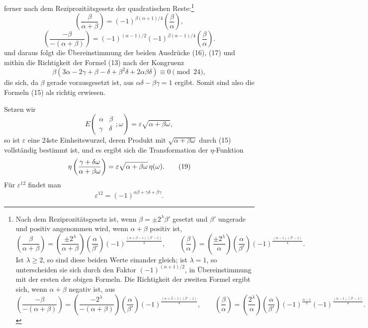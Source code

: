 \documentclass[11pt]{article}
\providecommand{\Jac}[2]{\left(\frac{#1}{#2}\right)}
\begin{document}
ferner nach dem Reziprozitätsgesetz der quadratischen Reste:\footnote{Nach dem Reziprozitätsgesetz ist, wenn $\beta=\pm2^\lambda\beta'$ gesetzt und $\beta'$ ungerade und positiv angenommen wird, wenn $\alpha+\beta$ positiv ist,
\[
\Jac{\beta}{\alpha+\beta}=\Jac{\pm2^\lambda}{\alpha+\beta}\Jac{\alpha}{\beta'}(-1)^{\frac{(\alpha+\beta-1)(\beta'-1)}{4}},
\qquad
\Jac{\beta}{\alpha}=\Jac{\pm2^\lambda}{\alpha}\Jac{\alpha}{\beta'}(-1)^{\frac{(\alpha-1)(\beta'-1)}{4}}.
\]
Ist $\lambda\ge2$, so sind diese beiden Werte einander gleich; ist $\lambda=1$, so unterscheiden sie sich durch den Faktor $(-1)^{(\alpha+1)/2}$, in Übereinstimmung mit der ersten der obigen Formeln. Die Richtigkeit der zweiten Formel ergibt sich, wenn $\alpha+\beta$ negativ ist, aus
\[
\Jac{-\beta}{-(\alpha+\beta)}=\Jac{-2^\lambda}{-(\alpha+\beta)}\Jac{\alpha}{\beta'}(-1)^{\frac{(\alpha+\beta-1)(\beta'-1)}{4}},
\qquad
\Jac{\beta}{\alpha}=\Jac{2^\lambda}{\alpha}\Jac{\alpha}{\beta'}(-1)^{\frac{\alpha-1}{2}}(-1)^{\frac{(\alpha-1)(\beta'-1)}{4}}.
\]
}
\[
\Jac{\beta}{\alpha+\beta}=(-1)^{\beta(\alpha+1)/4}\Jac{\beta}{\alpha},
\]
\[
\Jac{-\beta}{-(\alpha+\beta)}=(-1)^{(\alpha-1)/2}(-1)^{\beta(\alpha-1)/4}\Jac{\beta}{\alpha}.
\]
und daraus folgt die Übereinstimmung der beiden Ausdrücke (16), (17) und mithin die Richtigkeit der Formel (13) nach der Kongruenz
\[
\beta(3\alpha-2\gamma+\beta-\delta+\beta^2\delta+2\alpha\beta\delta)
\equiv0\pmod{24},
\]
die sich, da $\beta$ gerade vorausgesetzt ist, aus $\alpha\delta-\beta\gamma=1$ ergibt. Somit sind also die Formeln (15) als richtig erwiesen.

Setzen wir
\begin{equation}
E\left(\begin{matrix}\alpha&\beta\\\gamma&\delta\end{matrix};\omega\right)
=\varepsilon\sqrt{\alpha+\beta\omega},
\tag{18}
\end{equation}
so ist $\varepsilon$ eine 24ste Einheitswurzel, deren Produkt mit $\sqrt{\alpha+\beta\omega}$ durch (15) vollständig bestimmt ist, und es ergibt sich die Transformation der $\eta$-Funktion
\begin{equation}
\eta\left({\gamma+\delta\omega\over\alpha+\beta\omega}\right)
=\varepsilon\sqrt{\alpha+\beta\omega}\,\eta(\omega).
\tag{19}
\end{equation}
Für $\varepsilon^{12}$ findet man
\begin{equation}
\varepsilon^{12}=(-1)^{\alpha\beta+\gamma\delta+\beta\gamma}. 
\tag{20}
\end{equation}
\end{document}

